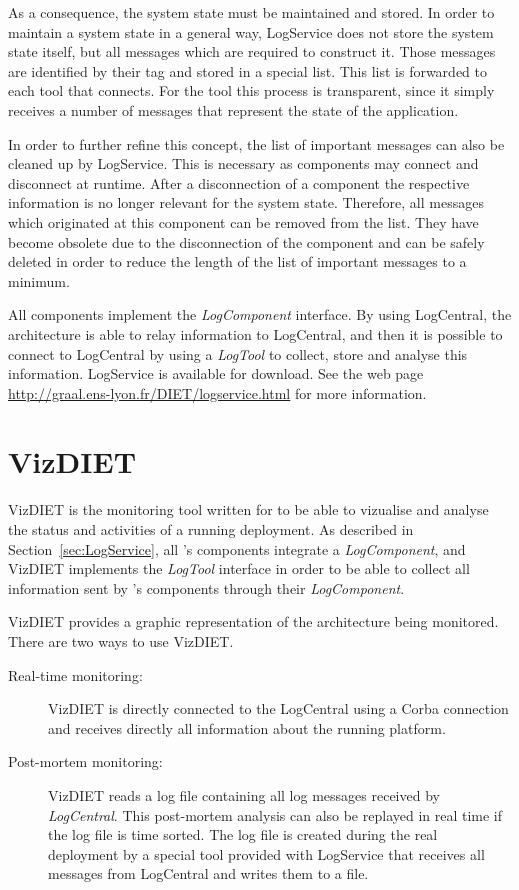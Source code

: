 \begin{description}
    As a consequence, the system state must be maintained and stored.  In order
    to maintain a system state in a general way, LogService does not store the
    system state itself, but all messages which are required to construct it.
    Those messages are identified by their tag and stored in a special list.
    This list is forwarded to each tool that connects.  For the tool this
    process is transparent, since it simply receives a number of messages that
    represent the state of the application.
    \label{ref:LogService_system_stats}

    In order to further refine this concept, the list of important messages can
    also be cleaned up by LogService. This is necessary as components may
    connect and disconnect at runtime. After a disconnection of a component the
    respective information is no longer relevant for the system state.
    Therefore, all messages which originated at this component can be removed
    from the list. They have become obsolete due to the disconnection of the
    component and can be safely deleted in order to reduce the length of the
    list of important messages to a minimum.
    \end{description}

All \diet components implement the \textit{LogComponent} interface. By using
LogCentral, the \diet architecture is able to relay information to LogCentral,
and then it is possible to connect to LogCentral by using a \textit{LogTool} to
collect, store and analyse this information. LogService is available for
download. See the web page \url{http://graal.ens-lyon.fr/DIET/logservice.html}
for more information.

\section{VizDIET}
\label{sec:VizDIET}
VizDIET is the monitoring tool written for \diet to be able to vizualise and
analyse the status and activities of a running \diet deployment. As described
in Section~\ref{sec:LogService}, all \diet's components integrate a
\textit{LogComponent}, and VizDIET implements the \textit{LogTool} interface in
order to be able to collect all information sent by \diet's components through
their \textit{LogComponent}.

VizDIET provides a graphic representation of the \diet architecture being
monitored. There are two ways to use VizDIET.
\begin{description}
\item[Real-time monitoring:] VizDIET is directly connected to the LogCentral
  using a Corba connection and receives directly all information about the
  running \diet platform.

\item[Post-mortem monitoring:] VizDIET reads a log file containing all log
  messages received by \textit{LogCentral}.  This post-mortem analysis can also
  be replayed in  real time if the log file is time sorted.  The log file is
  created during the real deployment by a special tool provided with LogService
  that receives all messages from LogCentral and writes them to a file.
\end{description}

